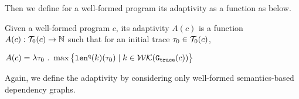 {\begin{defn}
\end{defn}
Then we define for a well-formed program its adaptivity as a function as below.
\begin{defn}
    \label{def:trace_adapt}
    Given a well-formed program ${c}$, 
    its adaptivity $A(c)$ is a function 
    $A(c) : \mathcal{T}_0(c)\to \mathbb{N}$ such that for an
    initial trace $\mathtt{\tau}_0 \in \mathcal{T}_0(c)$, 
\begin{center}
$
    A(c) = \lambda \mathtt{\tau}_0 ~.~ \max \big 
    \{ \mathtt{len}^{\tt q}(k)(\mathtt{\tau}_0) \mid k \in \mathcal{WK}(\mathtt{{G_{trace}}}(c)) \big \} 
$
\end{center}
\end{defn}
Again, we define the adaptivity by considering only well-formed semantics-based dependency graphs.
}